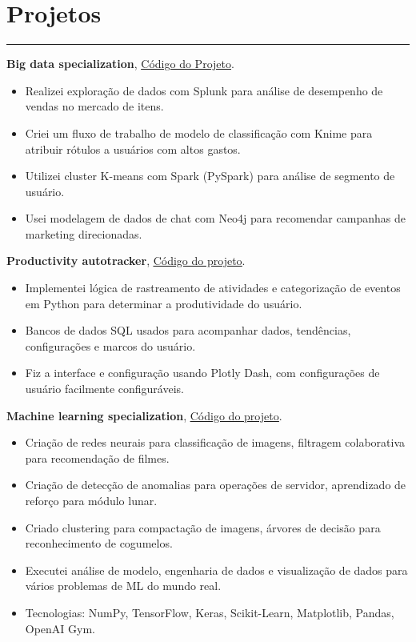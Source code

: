 \documentclass[a4paper,10pt]{article}
\newcommand{\ulink}[2]{\href{#1}{\underline{#2}}}
\begin{document}
\section*{Projetos}
\hrule
\vspace{2mm}
\textbf{Big data specialization}, \ulink{https://github.com/rokobo/Big-Data-Specialization}{Código do Projeto}.
\begin{itemize}[itemsep=0pt]
  \item Realizei exploração de dados com Splunk para análise de desempenho de vendas no mercado de itens.
  \item Criei um fluxo de trabalho de modelo de classificação com Knime para atribuir rótulos a usuários com altos gastos.
  \item Utilizei cluster K-means com Spark (PySpark) para análise de segmento de usuário.
  \item Usei modelagem de dados de chat com Neo4j para recomendar campanhas de marketing direcionadas.
\end{itemize}
\textbf{Productivity autotracker}, \ulink{https://github.com/rokobo/Productivity-autotracker}{Código do projeto}.
\begin{itemize}[itemsep=0pt]
  \item Implementei lógica de rastreamento de atividades e categorização de eventos em Python para determinar a produtividade do usuário.
  \item Bancos de dados SQL usados para acompanhar dados, tendências, configurações e marcos do usuário.
  \item Fiz a interface e configuração usando Plotly Dash, com configurações de usuário facilmente configuráveis.
\end{itemize}
\textbf{Machine learning specialization}, \ulink{https://github.com/rokobo/Machine-learning-specialization}{Código do projeto}.
\begin{itemize}[itemsep=0pt]
  \item Criação de redes neurais para classificação de imagens, filtragem colaborativa para recomendação de filmes.
  \item Criação de detecção de anomalias para operações de servidor, aprendizado de reforço para módulo lunar.
  \item Criado clustering para compactação de imagens, árvores de decisão para reconhecimento de cogumelos.
  \item Executei análise de modelo, engenharia de dados e visualização de dados para vários problemas de ML do mundo real.
  \item Tecnologias: NumPy, TensorFlow, Keras, Scikit-Learn, Matplotlib, Pandas, OpenAI Gym.
\end{itemize}
\end{document}
